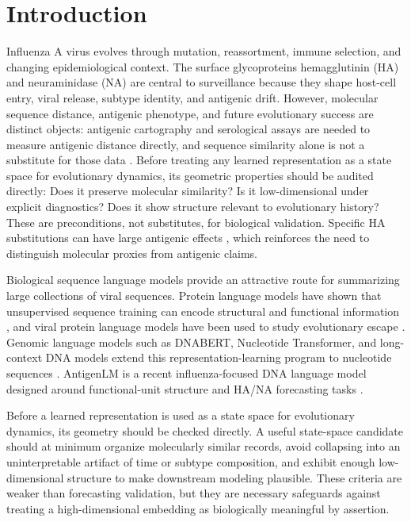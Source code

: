 \documentclass[11pt]{article}
\begin{document}
\section{Introduction}

Influenza A virus evolves through mutation, reassortment, immune selection, and changing epidemiological context. The surface glycoproteins hemagglutinin (HA) and neuraminidase (NA) are central to surveillance because they shape host-cell entry, viral release, subtype identity, and antigenic drift. However, molecular sequence distance, antigenic phenotype, and future evolutionary success are distinct objects: antigenic cartography and serological assays are needed to measure antigenic distance directly, and sequence similarity alone is not a substitute for those data \cite{smith2004mapping,bedford2014integrating}. Before treating any learned representation as a state space for evolutionary dynamics, its geometric properties should be audited directly: Does it preserve molecular similarity? Is it low-dimensional under explicit diagnostics? Does it show structure relevant to evolutionary history? These are preconditions, not substitutes, for biological validation. Specific HA substitutions can have large antigenic effects \cite{koel2013substitutions}, which reinforces the need to distinguish molecular proxies from antigenic claims.

Biological sequence language models provide an attractive route for summarizing large collections of viral sequences. Protein language models have shown that unsupervised sequence training can encode structural and functional information \cite{rives2021biological}, and viral protein language models have been used to study evolutionary escape \cite{hie2021viral}. Genomic language models such as DNABERT, Nucleotide Transformer, and long-context DNA models extend this representation-learning program to nucleotide sequences \cite{ji2021dnabert,dallatorre2025nucleotide,nguyen2023hyenadna}. AntigenLM is a recent influenza-focused DNA language model designed around functional-unit structure and HA/NA forecasting tasks \cite{pei2026antigenlm}.

Before a learned representation is used as a state space for evolutionary dynamics, its geometry should be checked directly. A useful state-space candidate should at minimum organize molecularly similar records, avoid collapsing into an uninterpretable artifact of time or subtype composition, and exhibit enough low-dimensional structure to make downstream modeling plausible. These criteria are weaker than forecasting validation, but they are necessary safeguards against treating a high-dimensional embedding as biologically meaningful by assertion.
\end{document}
